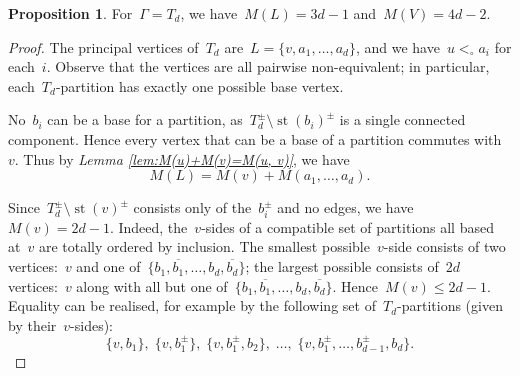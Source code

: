 \documentclass[11pt]{amsart}
\theoremstyle{definition}
\theoremstyle{definition}
\theoremstyle{definition}
\theoremstyle{definition}
\newtheorem{proposition}[theorem]{Proposition}
\newcommand{\str}[1]{\operatorname{st}({#1})} %
\begin{document}
\begin{proposition}\label{prop:M(L), M(V) for rake graphs}
    For~$\Gamma = T_d$, we have~$M(L) = 3d-1$ and~$M(V) = 4d-2$.
\end{proposition}

\begin{proof}
    The principal vertices of~$T_d$ are~$L = \{v, a_1, \dots, a_d\}$, and we have~$u <_\circ a_i$ for each~$i$. Observe that the vertices are all pairwise non-equivalent; in particular, each~$T_d$-partition has exactly one possible base vertex.
    
    No~$b_i$ can be a base for a partition, as~$T_d^\pm \setminus \str{b_i}^\pm$ is a single connected component. Hence every vertex that can be a base of a partition commutes with~$v$. Thus by \textit{Lemma \ref{lem:M(u)+M(v)=M(u, v)}}, we have 
    \[M(L) = M(v) + M(a_1, \dots, a_d).\]

    Since~$T_d^\pm \setminus \str{v}^\pm$ consists only of the~$b_i^\pm$ and no edges, we have~$M(v) = 2d-1$. Indeed, the~$v$-sides of a compatible set of partitions all based at~$v$ are totally ordered by inclusion. The smallest possible~$v$-side consists of two vertices:~$v$ and one of~$\{b_1, \overline{b_1}, \dots, b_d, \overline{b_d}\}$; the largest possible consists of~$2d$ vertices:~$v$ along with all but one of~$\{b_1, \overline{b_1}, \dots, b_d, \overline{b_d}\}$. Hence~$M(v) \leq 2d-1$. Equality can be realised, for example by the following set of~$T_d$-partitions (given by their~$v$-sides):
    \begin{equation}\label{eqn:list of (2d-1) v-partitions}
        \{v, b_1\},\; \{v, b_1^\pm\},\; \{v, b_1^\pm, b_2\},\; \dots,\; \{v, b_1^\pm, \dots, b_{d-1}^\pm, b_d\}.
        \tag{$\star$}
    \end{equation}


\end{proof}
\end{document}
